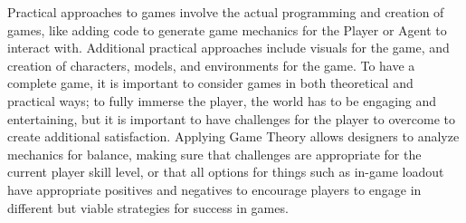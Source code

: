 Practical approaches to games involve the actual programming
and creation of games, like adding code to generate game
mechanics for the Player or Agent to interact with.
Additional practical approaches include visuals for the game,
and creation of characters, models, and environments for the
game. To have a complete game, it is important to consider
games in both theoretical and practical ways; to fully
immerse the player, the world has to be engaging and
entertaining, but it is important to have challenges for the
player to overcome to create additional satisfaction.
Applying Game Theory allows designers to analyze mechanics
for balance, making sure that challenges are appropriate for
the current player skill level, or that all options for
things such as in-game loadout have appropriate positives
and negatives to encourage players to engage in different
but viable strategies for success in games.


